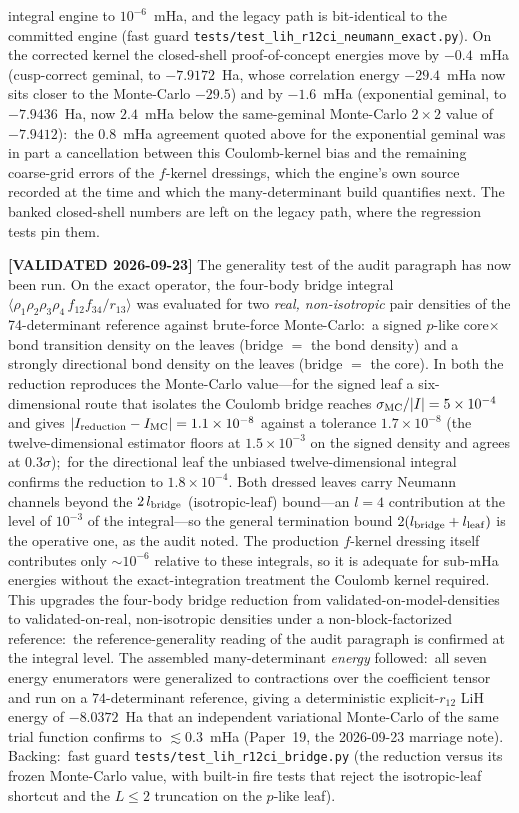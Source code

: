 \documentclass[aps,pra,twocolumn,superscriptaddress,longbibliography]{revtex4-2}
\begin{document}
integral engine to $10^{-6}$~mHa, and the legacy path is bit-identical to the
committed engine (fast guard \texttt{tests/test\_lih\_r12ci\_neumann\_exact.py}).
On the corrected kernel the closed-shell proof-of-concept energies move by
$-0.4$~mHa (cusp-correct geminal, to $-7.9172$~Ha, whose correlation energy
$-29.4$~mHa now sits closer to the Monte-Carlo $-29.5$) and by $-1.6$~mHa
(exponential geminal, to $-7.9436$~Ha, now $2.4$~mHa below the same-geminal
Monte-Carlo $2\times2$ value of $-7.9412$):\ the $0.8$~mHa agreement quoted
above for the exponential geminal was in part a cancellation between this
Coulomb-kernel bias and the remaining coarse-grid errors of the $f$-kernel
dressings, which the engine's own source recorded at the time and which the
many-determinant build quantifies next.  The banked closed-shell numbers are
left on the legacy path, where the regression tests pin them.

\textbf{[VALIDATED 2026-09-23]}  The generality test of the audit paragraph
has now been run.  On the exact operator, the four-body bridge integral
$\langle\rho_1\rho_2\rho_3\rho_4\,f_{12}f_{34}/r_{13}\rangle$ was evaluated for
two \emph{real, non-isotropic} pair densities of the 74-determinant reference
against brute-force Monte-Carlo:\ a signed $p$-like core$\times$bond transition
density on the leaves (bridge $=$ the bond density) and a strongly directional
bond density on the leaves (bridge $=$ the core).  In both the reduction
reproduces the Monte-Carlo value---for the signed leaf a six-dimensional
route that isolates the Coulomb bridge reaches $\sigma_{\rm MC}/|I|=5\times
10^{-4}$ and gives $|I_{\rm reduction}-I_{\rm MC}|=1.1\times10^{-8}$ against a
tolerance $1.7\times10^{-8}$ (the twelve-dimensional estimator floors at
$1.5\times10^{-3}$ on the signed density and agrees at $0.3\sigma$);\ for the
directional leaf the unbiased twelve-dimensional integral confirms the
reduction to $1.8\times10^{-4}$.  Both dressed leaves carry Neumann channels
beyond the $2\,l_{\rm bridge}$ (isotropic-leaf) bound---an $l=4$ contribution
at the level of $10^{-3}$ of the integral---so the general termination bound
$2(l_{\rm bridge}+l_{\rm leaf})$ is the operative one, as the audit noted.  The
production $f$-kernel dressing itself contributes only $\sim\!10^{-6}$ relative
to these integrals, so it is adequate for sub-mHa energies without the
exact-integration treatment the Coulomb kernel required.  This upgrades the
four-body bridge reduction from validated-on-model-densities to
validated-on-real, non-isotropic densities under a non-block-factorized
reference:\ the reference-generality reading of the audit paragraph is
confirmed at the integral level.  The assembled many-determinant \emph{energy}
followed:\ all seven energy enumerators were generalized to contractions over
the coefficient tensor and run on a $74$-determinant reference, giving a
deterministic explicit-$r_{12}$ LiH energy of $-8.0372$~Ha that an independent
variational Monte-Carlo of the same trial function confirms to
$\lesssim0.3$~mHa (Paper~19, the 2026-09-23 marriage note).  Backing:\ fast guard
\texttt{tests/test\_lih\_r12ci\_bridge.py} (the reduction versus its frozen
Monte-Carlo value, with built-in fire tests that reject the isotropic-leaf
shortcut and the $L\le2$ truncation on the $p$-like leaf).
\end{document}

